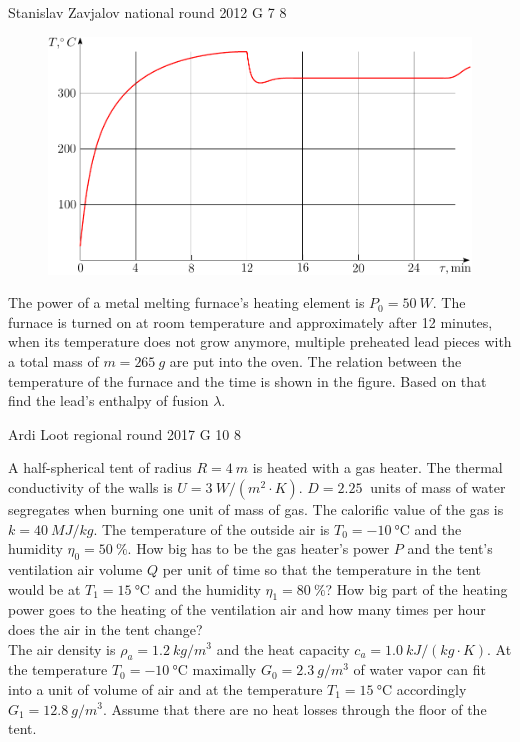 \documentclass[11pt]{article}
\begin{document}
{Stanislav Zavjalov} %
{national round} %
{2012} %
{G 7} %
{8} %
{

\ifEngStatement
\begin{figure}%
\includegraphics[width=\linewidth]{2012-v3g-07-ahi_graafik}%
\end{figure}
The power of a metal melting furnace’s heating element is $P_0 = \SI{50}{W}$. The furnace is turned on at room temperature and approximately after 12 minutes, when its temperature does not grow anymore, multiple preheated lead pieces with a total mass of $m = \SI{265}{g}$ are put into the oven. The relation between the temperature of the furnace and the time is shown in the figure. Based on that find the lead’s enthalpy of fusion $\lambda$.
\fi
}

{Ardi Loot} %
{regional round} %
{2017} %
{G 10} %
{8} %
{

\ifEngStatement
A half-spherical tent of radius $R=\SI{4}{m}$ is heated with a gas heater. The thermal conductivity of the walls is $U=\SI{3}{W/\left(m^{2}\cdot K\right)}$. $D=\SI{2.25}{}$ units of mass of water segregates when burning one unit of mass of gas. The calorific value of the gas is $k=\SI{40}{MJ/kg}$. The temperature of the outside air is $T_{0}=\SI{-10}{\celsius}$ and the humidity $\eta_{0}=\SI{50}{\percent}$. How big has to be the gas heater’s power $P$ and the tent’s ventilation air volume $Q$ per unit of time so that the temperature in the tent would be at $T_{1}=\SI{15}{\celsius}$ and the humidity $\eta_{1}=\SI{80}{\percent}$? How big part of the heating power goes to the heating of the ventilation air and how many times per hour does the air in the tent change?\\
The air density is $\rho_{a}=\SI{1.2}{kg/m^{3}}$ and the heat capacity $c_{a}=\SI{1.0}{kJ/\left(kg\cdot K\right)}$. At the temperature $T_{0}=\SI{-10}{\celsius}$ maximally $G_{0}=\SI{2.3}{g/m^{3}}$ of water vapor can fit into a unit of volume of air and at the temperature $T_{1}=\SI{15}{\celsius}$ accordingly $G_{1}=\SI{12.8}{g/m^{3}}$. Assume that there are no heat losses through the floor of the tent.
\fi
}
\end{document}

